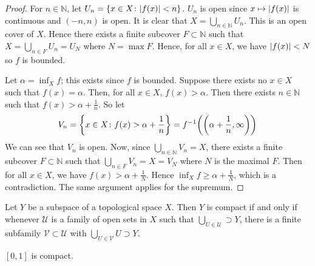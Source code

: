 \begin{proof}
	For \( n \in \mathbb N \), let \( U_n = \qty{ x \in X \colon \abs{f(x)} < n} \).
	\( U_n \) is open since \( x \mapsto \abs{f(x)} \) is continuous and \( (-n,n) \) is open.
	It is clear that \( X = \bigcup_{n \in \mathbb N} U_n \).
	This is an open cover of \( X \).
	Hence there exists a finite subcover \( F \subset \mathbb N \) such that \( X = \bigcup_{n \in F} U_n = U_N \) where \( N = \max F \).
	Hence, for all \( x \in X \), we have \( \abs{f(x)} < N \) so \( f \) is bounded.

	Let \( \alpha = \inf_X f \); this exists since \( f \) is bounded.
	Suppose there exists no \( x \in X \) such that \( f(x) = \alpha \).
	Then, for all \( x \in X \), \( f(x) > \alpha \).
	Then there exists \( n \in \mathbb N \) such that \( f(x) > \alpha + \frac{1}{n} \).
	So let
	\[
		V_n = \qty{ x \in X \colon f(x) > \alpha + \frac{1}{n} } = f^{-1}\qty(\qty(\alpha + \frac{1}{n}, \infty))
	\]
	We can see that \( V_n \) is open.
	Now, since \( \bigcup_{n \in \mathbb N} V_n = X \), there exists a finite subcover \( F \subset \mathbb N \) such that \( \bigcup_{n \in F} V_n = X = V_N \) where \( N \) is the maximal \( F \).
	Then for all \( x \in X \), we have \( f(x) > \alpha + \frac{1}{N} \).
	Hence \( \inf_X f \geq \alpha + \frac{1}{N} \), which is a contradiction.
	The same argument applies for the supremum.
\end{proof}
\begin{lemma}
	Let \( Y \) be a subspace of a topological space \( X \).
	Then \( Y \) is compact if and only if whenever \( \mathcal U \) is a family of open sets in \( X \) such that \( \bigcup_{U \in \mathcal U} \supset Y \), there is a finite subfamily \( \mathcal V \subset \mathcal U \) with \( \bigcup_{U \in \mathcal V} U \supset Y \).
\end{lemma}
\begin{theorem}
	\( [0,1] \) is compact.
\end{theorem}
